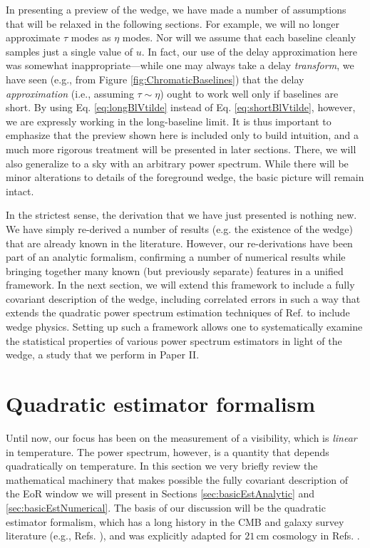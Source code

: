\documentclass[twocolumn,aps,prd,nofootinbib,showpacs]{revtex4-1}
\begin{document}
In presenting a preview of the wedge, we have made a number of assumptions that will be relaxed in the following sections.  For example, we will no longer approximate $\tau$ modes as $\eta$ modes.  Nor will we assume that each baseline cleanly samples just a single value of $u$.  In fact, our use of the delay approximation here was somewhat inappropriate---while one may always take a delay \emph{transform}, we have seen (e.g., from Figure \ref{fig:ChromaticBaselines}) that the delay \emph{approximation} (i.e., assuming $\tau\sim \eta$) ought to work well only if baselines are short.  By using Eq. \eqref{eq:longBlVtilde} instead of Eq. \eqref{eq:shortBlVtilde}, however, we are expressly working in the long-baseline limit.  It is thus important to emphasize that the preview shown here is included only to build intuition, and a much more rigorous treatment will be presented in later sections.  There, we will also generalize to a sky with an arbitrary power spectrum.  While there will be minor alterations to details of the foreground wedge, the basic picture will remain intact.

In the strictest sense, the derivation that we have just presented is nothing new.  We have simply re-derived a number of results (e.g. the existence of the wedge) that are already known in the literature.  However, our re-derivations have been part of an analytic formalism, confirming a number of numerical results while bringing together many known (but previously separate) features in a unified framework.  In the next section, we will extend this framework to include a fully covariant description of the wedge, including correlated errors in such a way that extends the quadratic power spectrum estimation techniques of Ref. \cite{Liu2011} to include wedge physics.  Setting up such a framework allows one to systematically examine the statistical properties of various power spectrum estimators in light of the wedge, a study that we perform in Paper II.

\section{Quadratic estimator formalism}
\label{sec:QuadEst}
Until now, our focus has been on the measurement of a visibility, which is \emph{linear} in temperature.  The power spectrum, however, is a quantity that depends quadratically on temperature.  In this section we very briefly review the mathematical machinery that makes possible the fully covariant description of the EoR window we will present in Sections \ref{sec:basicEstAnalytic} and \ref{sec:basicEstNumerical}.  The basis of our discussion will be the quadratic estimator formalism, which has a long history in the CMB and galaxy survey literature (e.g., Refs. \cite{Tegmark1997b,Bond1998,Tegmark1998}), and was explicitly adapted for $21\,\textrm{cm}$ cosmology in Refs. \cite{Liu2011,Dillon2013}.
\end{document}
